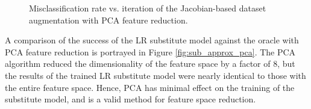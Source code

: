\begin{figure}
	\centering
	\qquad
	\caption{Misclassification rate vs. iteration of the Jacobian-based dataset augmentation with PCA feature reduction.}
\end{figure}

A comparison of the success of the LR substitute model against the oracle with PCA feature reduction is portrayed in Figure \ref{fig:sub_approx_pca}. The PCA algorithm reduced the dimensionality of the feature space by a factor of 8, but the results of the trained LR substitute model were nearly identical to those with the entire feature space. Hence, PCA has minimal effect on the training of the substitute model, and is a valid method for feature space reduction. 


